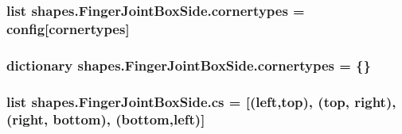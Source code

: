 \subsubsection[{cornertypes}]{\setlength{\rightskip}{0pt plus 5cm}list shapes.\+Finger\+Joint\+Box\+Side.\+cornertypes = {\bf config}\mbox{[}\textquotesingle{}cornertypes\textquotesingle{}\mbox{]}\hspace{0.3cm}{\ttfamily [static]}}\label{classshapes_1_1_finger_joint_box_side_a9a16221e6316b0f811e841990f151886}
\hypertarget{classshapes_1_1_finger_joint_box_side_a697b524bcc668931603cd7dc75177803}{}
\subsubsection[{cornertypes}]{\setlength{\rightskip}{0pt plus 5cm}dictionary shapes.\+Finger\+Joint\+Box\+Side.\+cornertypes = \{\}\hspace{0.3cm}{\ttfamily [static]}}\label{classshapes_1_1_finger_joint_box_side_a697b524bcc668931603cd7dc75177803}
\hypertarget{classshapes_1_1_finger_joint_box_side_aece206e78443db271178fcfdbafd191c}{}
\subsubsection[{cs}]{\setlength{\rightskip}{0pt plus 5cm}list shapes.\+Finger\+Joint\+Box\+Side.\+cs = \mbox{[}(\textquotesingle{}left\textquotesingle{},\textquotesingle{}top\textquotesingle{}), (\textquotesingle{}top\textquotesingle{}, \textquotesingle{}right\textquotesingle{}), (\textquotesingle{}right\textquotesingle{}, \textquotesingle{}bottom\textquotesingle{}), (\textquotesingle{}bottom\textquotesingle{},\textquotesingle{}left\textquotesingle{})\mbox{]}\hspace{0.3cm}{\ttfamily [static]}}\label{classshapes_1_1_finger_joint_box_side_aece206e78443db271178fcfdbafd191c}
\hypertarget{classshapes_1_1_finger_joint_box_side_ae038c24a3bbe34afb5419a4e33afa829}{}
